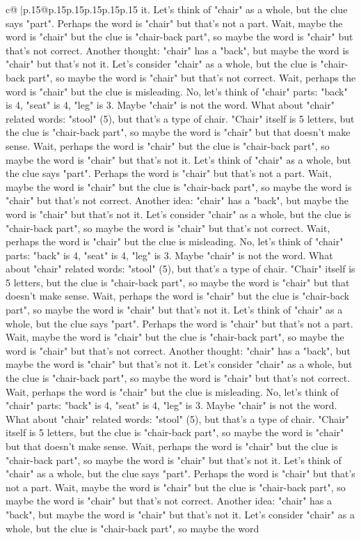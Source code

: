 \documentclass{article}
\begin{document}
{\begin{supertabular}{c@{$\;$}|p{.15\linewidth}@{}p{.15\linewidth}p{.15\linewidth}p{.15\linewidth}p{.15\linewidth}p{.15\linewidth}}
{{{it. Let's think of "chair" as a whole, but the clue says "part". Perhaps the word is "chair" but that's not a part. Wait, maybe the word is "chair" but the clue is "chair{-}back part", so maybe the word is "chair" but that's not correct. Another thought: "chair" has a "back", but maybe the word is "chair" but that's not it. Let's consider "chair" as a whole, but the clue is "chair{-}back part", so maybe the word is "chair" but that's not correct. Wait, perhaps the word is "chair" but the clue is misleading. No, let's think of "chair" parts: "back" is 4, "seat" is 4, "leg" is 3. Maybe "chair" is not the word. What about "chair" related words: "stool" (5), but that's a type of chair. "Chair" itself is 5 letters, but the clue is "chair{-}back part", so maybe the word is "chair" but that doesn't make sense. Wait, perhaps the word is "chair" but the clue is "chair{-}back part", so maybe the word is "chair" but that's not it. Let's think of "chair" as a whole, but the clue says "part". Perhaps the word is "chair" but that's not a part. Wait, maybe the word is "chair" but the clue is "chair{-}back part", so maybe the word is "chair" but that's not correct. Another idea: "chair" has a "back", but maybe the word is "chair" but that's not it. Let's consider "chair" as a whole, but the clue is "chair{-}back part", so maybe the word is "chair" but that's not correct. Wait, perhaps the word is "chair" but the clue is misleading. No, let's think of "chair" parts: "back" is 4, "seat" is 4, "leg" is 3. Maybe "chair" is not the word. What about "chair" related words: "stool" (5), but that's a type of chair. "Chair" itself is 5 letters, but the clue is "chair{-}back part", so maybe the word is "chair" but that doesn't make sense. Wait, perhaps the word is "chair" but the clue is "chair{-}back part", so maybe the word is "chair" but that's not it. Let's think of "chair" as a whole, but the clue says "part". Perhaps the word is "chair" but that's not a part. Wait, maybe the word is "chair" but the clue is "chair{-}back part", so maybe the word is "chair" but that's not correct. Another thought: "chair" has a "back", but maybe the word is "chair" but that's not it. Let's consider "chair" as a whole, but the clue is "chair{-}back part", so maybe the word is "chair" but that's not correct. Wait, perhaps the word is "chair" but the clue is misleading. No, let's think of "chair" parts: "back" is 4, "seat" is 4, "leg" is 3. Maybe "chair" is not the word. What about "chair" related words: "stool" (5), but that's a type of chair. "Chair" itself is 5 letters, but the clue is "chair{-}back part", so maybe the word is "chair" but that doesn't make sense. Wait, perhaps the word is "chair" but the clue is "chair{-}back part", so maybe the word is "chair" but that's not it. Let's think of "chair" as a whole, but the clue says "part". Perhaps the word is "chair" but that's not a part. Wait, maybe the word is "chair" but the clue is "chair{-}back part", so maybe the word is "chair" but that's not correct. Another idea: "chair" has a "back", but maybe the word is "chair" but that's not it. Let's consider "chair" as a whole, but the clue is "chair{-}back part", so maybe the word }}}
\end{supertabular}}
\end{document}
